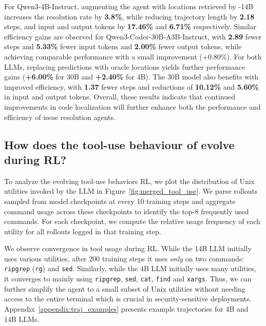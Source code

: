 For Qwen3-4B-Instruct, augmenting the agent with locations retrieved by \methodname-14B increases the resolution rate by \textbf{3.8\%}, while reducing trajectory length by \textbf{2.18} steps, and input and output tokens by \textbf{17.46\%} and \textbf{6.71\%} respectively. Similar efficiency gains are observed for Qwen3-Coder-30B-A3B-Instruct, with \textbf{2.89} fewer steps and \textbf{5.33\%} fewer input tokens and \textbf{2.00\%} fewer output tokens, while achieving comparable performance with a small improvement (+0.80\%). For both LLMs, replacing \methodname predictions with oracle locations yields further performance gains (\textbf{+6.00\%} for 30B and \textbf{+2.40\%} for 4B). The 30B model also benefits with improved efficiency, with \textbf{1.37} fewer steps and reductions of \textbf{10.12\%} and \textbf{5.60\%} in input and output tokens. Overall, these results indicate that continued improvements in code localization will further enhance both the performance and efficiency of issue resolution agents.

\subsection{How does the tool-use behaviour of \methodname evolve during RL?}\label{sec:tool_use_behaviour}
To analyze the evolving tool-use behaviors RL, we plot the distribution of Unix utilities invoked by the LLM in Figure~\ref{fig:merged_tool_use}. We parse rollouts sampled from model checkpoints at every 10 training steps and aggregate command usage across these checkpoints to identify the top-8 frequently used commands. For each checkpoint, we compute the relative usage frequency of each utility for all rollouts logged in that training step.

We observe convergence in tool usage during RL. While the 14B LLM initially uses various utilities, after 200 training steps it uses \emph{only} on two commands: \texttt{ripgrep} (\texttt{rg}) and \texttt{sed}. Similarly, while the 4B LLM initially uses many utilities, it converges to mainly using \texttt{ripgrep}, \texttt{sed}, \texttt{cat}, \texttt{find} and \texttt{xargs}. Thus, we can further simplify the agent to a small subset of Unix utilities without needing access to the entire terminal which is crucial in security-sensitive deployments. Appendix~\ref{appendix:traj_examples} presents example trajectories for 4B and 14B LLMs. 

